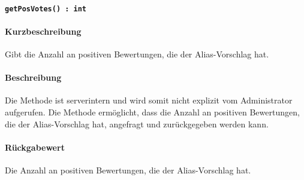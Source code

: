 \paragraph*{\texttt{getPosVotes() : int}}%
\paragraph*{Kurzbeschreibung}
Gibt die Anzahl an positiven Bewertungen, die der Alias-Vorschlag hat.
\paragraph*{Beschreibung}
Die Methode ist serverintern und wird somit nicht explizit vom Administrator aufgerufen.
Die Methode ermöglicht, dass die Anzahl an positiven Bewertungen, die der Alias-Vorschlag hat, angefragt und zurückgegeben werden kann.
\paragraph*{Rückgabewert}
Die Anzahl an positiven Bewertungen, die der Alias-Vorschlag hat.
